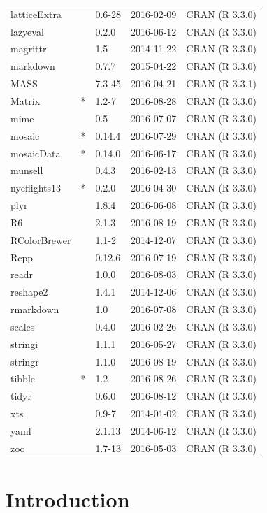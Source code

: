 \documentclass[]{tufte-book}
\begin{document}
\begin{longtable}{lllll}
latticeExtra &  & 0.6-28 & 2016-02-09 & CRAN (R 3.3.0)\\
lazyeval &  & 0.2.0 & 2016-06-12 & CRAN (R 3.3.0)\\
magrittr &  & 1.5 & 2014-11-22 & CRAN (R 3.3.0)\\
\addlinespace
markdown &  & 0.7.7 & 2015-04-22 & CRAN (R 3.3.0)\\
MASS &  & 7.3-45 & 2016-04-21 & CRAN (R 3.3.1)\\
Matrix & * & 1.2-7 & 2016-08-28 & CRAN (R 3.3.0)\\
mime &  & 0.5 & 2016-07-07 & CRAN (R 3.3.0)\\
mosaic & * & 0.14.4 & 2016-07-29 & CRAN (R 3.3.0)\\
\addlinespace
mosaicData & * & 0.14.0 & 2016-06-17 & CRAN (R 3.3.0)\\
munsell &  & 0.4.3 & 2016-02-13 & CRAN (R 3.3.0)\\
nycflights13 & * & 0.2.0 & 2016-04-30 & CRAN (R 3.3.0)\\
plyr &  & 1.8.4 & 2016-06-08 & CRAN (R 3.3.0)\\
R6 &  & 2.1.3 & 2016-08-19 & CRAN (R 3.3.0)\\
\addlinespace
RColorBrewer &  & 1.1-2 & 2014-12-07 & CRAN (R 3.3.0)\\
Rcpp &  & 0.12.6 & 2016-07-19 & CRAN (R 3.3.0)\\
readr &  & 1.0.0 & 2016-08-03 & CRAN (R 3.3.0)\\
reshape2 &  & 1.4.1 & 2014-12-06 & CRAN (R 3.3.0)\\
rmarkdown &  & 1.0 & 2016-07-08 & CRAN (R 3.3.0)\\
\addlinespace
scales &  & 0.4.0 & 2016-02-26 & CRAN (R 3.3.0)\\
stringi &  & 1.1.1 & 2016-05-27 & CRAN (R 3.3.0)\\
stringr &  & 1.1.0 & 2016-08-19 & CRAN (R 3.3.0)\\
tibble & * & 1.2 & 2016-08-26 & CRAN (R 3.3.0)\\
tidyr &  & 0.6.0 & 2016-08-12 & CRAN (R 3.3.0)\\
\addlinespace
xts &  & 0.9-7 & 2014-01-02 & CRAN (R 3.3.0)\\
yaml &  & 2.1.13 & 2014-06-12 & CRAN (R 3.3.0)\\
zoo &  & 1.7-13 & 2016-05-03 & CRAN (R 3.3.0)\\
\bottomrule
\end{longtable}

\chapter{Introduction}\label{intro}
\end{document}
